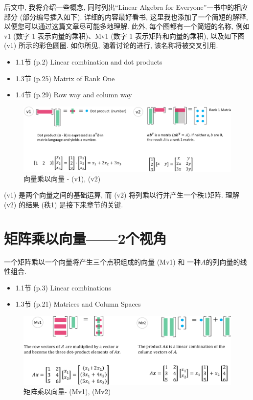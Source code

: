 \documentclass[letterpaper]{article}
\begin{document}
后文中, 我将介绍一些概念, 同时列出“Linear Algebra for Everyone”一书中的相应部分 (部分编号插入如下). 
详细的内容最好看书, 这里我也添加了一个简短的解释, 以便您可以通过这篇文章尽可能多地理解. 
此外, 每个图都有一个简短的名称, 例如 v1 (数字 1 表示向量的乘积)、Mv1 (数字 1 表示矩阵和向量的乘积), 以及如下图 (v1) 所示的彩色圆圈. 
如你所见, 随着讨论的进行, 该名称将被交叉引用. 

\begin{itemize}
  \item 1.1节 (p.2) Linear combination and dot products
  \item 1.3节 (p.25) Matrix of Rank One
  \item 1.4节 (p.29) Row way and column way
\end{itemize}

\begin{figure}[H]
  \centering
  \includegraphics[scale=0.8]{VectorTimesVector.eps}
  \caption{向量乘以向量 - (v1), (v2)}
\end{figure}

(v1) 是两个向量之间的基础运算, 而 (v2) 将列乘以行并产生一个秩1矩阵. 
理解 (v2) 的结果 (秩1) 是接下来章节的关键.

\section{矩阵乘以向量——2个视角}

一个矩阵乘以一个向量将产生三个点积组成的向量 (Mv1) 和
一种$A$的列向量的线性组合.

\begin{itemize}
  \item 1.1节 (p.3) Linear combinations
  \item 1.3节 (p.21) Matrices and Column Spaces
\end{itemize} 

\begin{figure}[H]
  \centering
  \includegraphics[scale=0.8]{MatrixTimesVector.eps}
  \caption{矩阵乘以向量- (Mv1), (Mv2)}
\end{figure}
\end{document}
